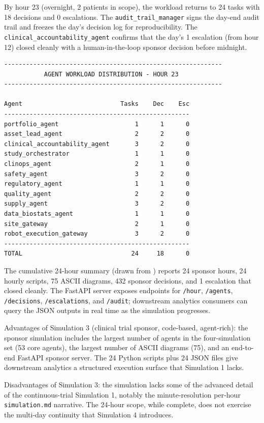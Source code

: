 By hour 23 (overnight, 2 patients in scope), the workload returns to
24 tasks with 18 decisions and 0 escalations. The
\texttt{audit\_trail\_manager} signs the day-end audit trail and
freezes the day's decision log for reproducibility. The
\texttt{clinical\_accountability\_agent} confirms that the day's 1
escalation (from hour 12) closed cleanly with a human-in-the-loop
sponsor decision before midnight.

\begin{verbatim}
------------------------------------------------------------
           AGENT WORKLOAD DISTRIBUTION - HOUR 23
------------------------------------------------------------

Agent                           Tasks    Dec    Esc
---------------------------------------------------
portfolio_agent                     1      1      0
asset_lead_agent                    2      2      0
clinical_accountability_agent       3      2      0
study_orchestrator                  1      1      0
clinops_agent                       2      1      0
safety_agent                        3      2      0
regulatory_agent                    1      1      0
quality_agent                       2      2      0
supply_agent                        3      2      0
data_biostats_agent                 1      1      0
site_gateway                        2      1      0
robot_execution_gateway             3      2      0
---------------------------------------------------
TOTAL                              24     18      0
\end{verbatim}


The cumulative 24-hour summary (drawn from
) reports 24 sponsor hours, 24 hourly
scripts, 75 ASCII diagrams, 432 sponsor decisions, and 1 escalation
that closed cleanly. The FastAPI server exposes endpoints for
\texttt{/hour}, \texttt{/agents}, \texttt{/decisions},
\texttt{/escalations}, and \texttt{/audit}; downstream analytics
consumers can query the JSON outputs in real time as the simulation
progresses.

Advantages of Simulation 3 (clinical trial sponsor, code-based,
agent-rich): the sponsor simulation includes the largest number of
agents in the four-simulation set (53 core agents), the largest number
of ASCII diagrams (75), and an end-to-end FastAPI sponsor server. The
24 Python scripts plus 24 JSON files give downstream analytics a
structured execution surface that Simulation 1 lacks.

Disadvantages of Simulation 3: the simulation lacks some of the
advanced detail of the continuous-trial Simulation 1, notably the
minute-resolution per-hour \texttt{simulation.md} narrative. The
24-hour scope, while complete, does not exercise the multi-day
continuity that Simulation 4 introduces.

